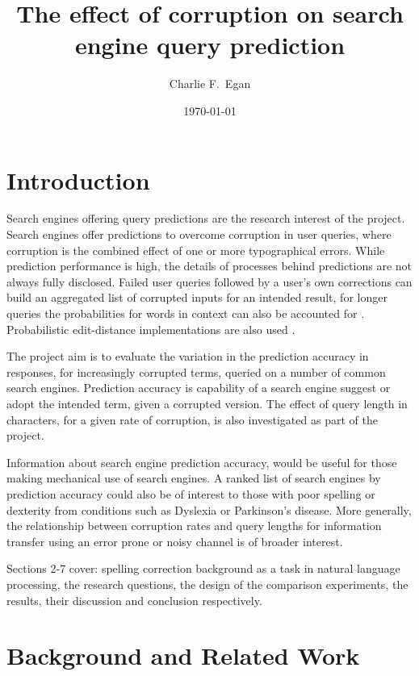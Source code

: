 \documentclass{csfourzero}
\title{The effect of corruption on search engine query prediction}
\author{Charlie F.\ Egan}
\date{\today}
\begin{document}
\maketitle

\section{Introduction}
\label{sec:intro}

Search engines offering query predictions are the research interest of the project. Search engines offer predictions to overcome corruption in user queries, where corruption is the combined effect of one or more typographical errors. While prediction performance is high, the details of processes behind predictions are not always fully disclosed. Failed user queries followed by a user's own corrections can build an aggregated list of corrupted inputs for an intended result, for longer queries the probabilities for words in context can also be accounted for \cite{noampatent}. Probabilistic edit-distance implementations are also used \cite{howtospellcorrector}.

The project aim is to evaluate the variation in the prediction accuracy in responses, for increasingly corrupted terms, queried on a number of common search engines. Prediction accuracy is capability of a search engine suggest or adopt the intended term, given a corrupted version. The effect of query length in characters, for a given rate of corruption, is also investigated as part of the project.

Information about search engine prediction accuracy, would be useful for those making mechanical use of search engines. A ranked list of search engines by prediction accuracy could also be of interest to those with poor spelling or dexterity from conditions such as Dyslexia or Parkinson's disease. More generally, the relationship between corruption rates and query lengths for information transfer using an error prone or noisy channel is of broader interest.

Sections 2-7 cover: spelling correction background as a task in natural language processing, the research questions, the design of the comparison experiments, the results, their discussion and conclusion respectively.

\section{Background and Related Work}
\label{sec:lit}
\end{document}
